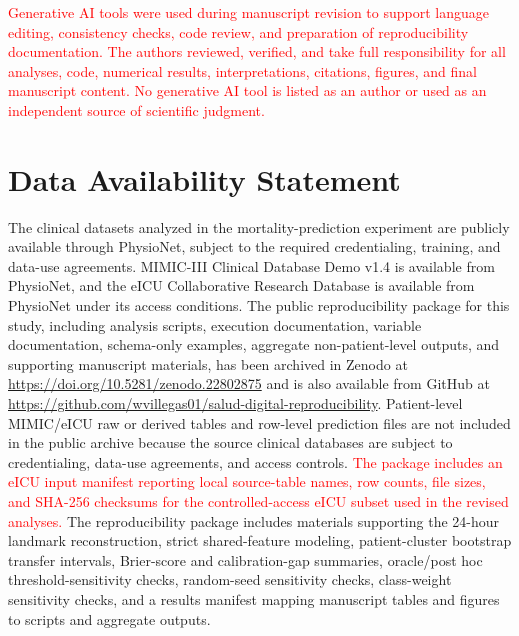 \documentclass[utf8]{FrontiersinHarvard} %
\begin{document}
\textcolor{red}{Generative AI tools were used during manuscript revision to support language editing, consistency checks, code review, and preparation of reproducibility documentation. The authors reviewed, verified, and take full responsibility for all analyses, code, numerical results, interpretations, citations, figures, and final manuscript content. No generative AI tool is listed as an author or used as an independent source of scientific judgment.}

\section*{Data Availability Statement}

The clinical datasets analyzed in the mortality-prediction experiment are publicly available through PhysioNet, subject to the required credentialing, training, and data-use agreements. MIMIC-III Clinical Database Demo v1.4 is available from PhysioNet, and the eICU Collaborative Research Database is available from PhysioNet under its access conditions. The public reproducibility package for this study, including analysis scripts, execution documentation, variable documentation, schema-only examples, aggregate non-patient-level outputs, and supporting manuscript materials, has been archived in Zenodo at \textcolor{red}{\url{https://doi.org/10.5281/zenodo.22802875}} and is also available from GitHub at \url{https://github.com/wvillegas01/salud-digital-reproducibility}. Patient-level MIMIC/eICU raw or derived tables and row-level prediction files are not included in the public archive because the source clinical databases are subject to credentialing, data-use agreements, and access controls. \textcolor{red}{The package includes an eICU input manifest reporting local source-table names, row counts, file sizes, and SHA-256 checksums for the controlled-access eICU subset used in the revised analyses.} The reproducibility package includes materials supporting the 24-hour landmark reconstruction, strict shared-feature modeling, patient-cluster bootstrap transfer intervals, Brier-score and calibration-gap summaries, oracle/post hoc threshold-sensitivity checks, random-seed sensitivity checks, class-weight sensitivity checks, and a results manifest mapping manuscript tables and figures to scripts and aggregate outputs.


\end{document}
